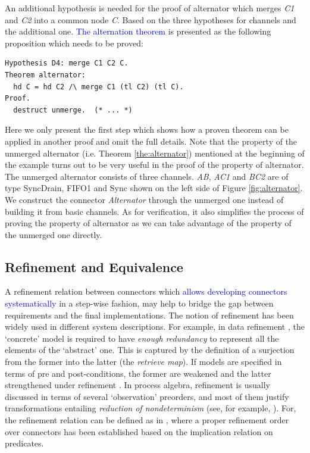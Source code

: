 \documentclass[preprint,3p]{elsarticle}
\newcommand{\liyi}[1]{\textcolor{blue}{#1}}
\newcommand{\xy}[1]{{#1}}
\begin{document}

An additional hypothesis is needed for the proof of alternator which merges \emph{C1} and \emph{C2} into a common node \emph{C}. Based on the three
hypotheses for channels and \xy{the additional one}. \liyi{The alternation theorem} is presented as the following proposition which needs to be proved:
\begin{lstlisting}[language=coq]
Hypothesis D4: merge C1 C2 C.
Theorem alternator:
  hd C = hd C2 /\ merge C1 (tl C2) (tl C).
Proof.
  destruct unmerge.  (* ... *)
\end{lstlisting}
\xy{Here we only present the first step which shows how a proven theorem can be applied in another proof and omit the full details.
Note that the property of the unmerged alternator (i.e. Theorem \ref{the:alternator}) mentioned at the beginning of the example turns out to be very useful in the proof of the property of alternator. The unmerged alternator consists of three channels. \emph{AB}, \emph{AC1} and \emph{BC2} are of type SyncDrain, FIFO1 and Sync shown on the left side of Figure \ref{fig:alternator}. We construct the connector \emph{Alternator} through the unmerged one instead of building it from basic channels. As for verification, it also simplifies the process of proving the property of alternator as we can take advantage of the property of the unmerged one directly.}


\subsection{Refinement and Equivalence}

A refinement relation between connectors which \liyi{allows developing connectors systematically} in a step-wise fashion, may help to bridge
the gap between requirements and the final implementations. The notion of refinement has been widely used in different system descriptions.
For example, in data refinement \cite{RE98}, the `concrete' model is required to have \emph{enough redundancy} to represent all the elements
of the `abstract' one. This is captured by the definition of a surjection from the former into the latter (the \emph{retrieve map}). If
models are specified in terms of pre and post-conditions, the former are weakened and the latter strengthened under refinement \cite{Jon90}.
In process algebra, refinement is usually discussed in terms of several `observation' preorders, and most of them justify
transformations entailing \emph{reduction of nondeterminism} (see, for
example, \cite{Ros98}). For, the refinement relation can be
defined as in \cite{SAA+12}, where a proper refinement order over
connectors has been established based on the implication relation on
predicates.
\end{document}
